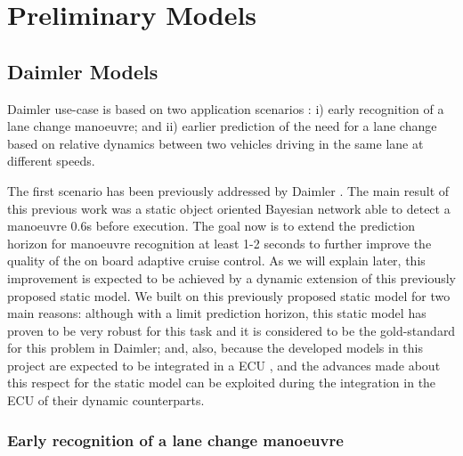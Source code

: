 \section{Preliminary Models}
\subsection{Daimler Models}


Daimler use-case is based on two application scenarios \cite{Fer14}: i) early recognition of a lane change manoeuvre; and ii) earlier prediction of the need for a lane change based on relative dynamics between two vehicles driving in the same lane at different speeds. 

The first scenario has been previously addressed by Daimler \cite{kasper2012object}. The main result of this previous work was a static object oriented Bayesian network \cite{koller1997object} able to detect a manoeuvre 0.6s before execution. The goal now is to extend the prediction horizon for manoeuvre recognition at least 1-2 seconds to further improve the quality of the on board adaptive cruise control. As we will explain later, this improvement is expected to be achieved by a dynamic extension of this previously proposed static model. We built on this previously proposed static model for two main reasons: although with a limit prediction horizon, this static model has proven to be very robust for this task and it is considered to be the gold-standard for this problem in Daimler; and, also, because the developed models in this project are expected to be integrated in a ECU \cite{Fer14}, and the advances made about this respect for the static model \cite{Weidl2014} can be exploited during the integration in the ECU of their dynamic counterparts. 



\subsubsection{Early recognition of a lane change manoeuvre}

